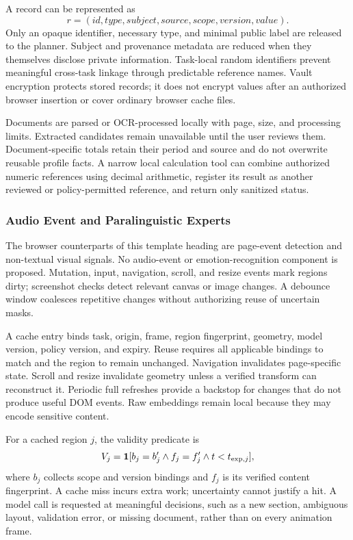 \documentclass[conference]{IEEEtran}
\begin{document}
A record can be represented as
\begin{equation}
 r=(id,type,subject,source,scope,version,value).
\end{equation}
Only an opaque identifier, necessary type, and minimal public label are released to the planner. Subject and provenance metadata are reduced when they themselves disclose private information. Task-local random identifiers prevent meaningful cross-task linkage through predictable reference names. Vault encryption protects stored records; it does not encrypt values after an authorized browser insertion or cover ordinary browser cache files.

Documents are parsed or OCR-processed locally with page, size, and processing limits. Extracted candidates remain unavailable until the user reviews them. Document-specific totals retain their period and source and do not overwrite reusable profile facts. A narrow local calculation tool can combine authorized numeric references using decimal arithmetic, register its result as another reviewed or policy-permitted reference, and return only sanitized status.

\subsubsection{Audio Event and Paralinguistic Experts}
The browser counterparts of this template heading are page-event detection and non-textual visual signals. No audio-event or emotion-recognition component is proposed. Mutation, input, navigation, scroll, and resize events mark regions dirty; screenshot checks detect relevant canvas or image changes. A debounce window coalesces repetitive changes without authorizing reuse of uncertain masks.

A cache entry binds task, origin, frame, region fingerprint, geometry, model version, policy version, and expiry. Reuse requires all applicable bindings to match and the region to remain unchanged. Navigation invalidates page-specific state. Scroll and resize invalidate geometry unless a verified transform can reconstruct it. Periodic full refreshes provide a backstop for changes that do not produce useful DOM events. Raw embeddings remain local because they may encode sensitive content.

For a cached region $j$, the validity predicate is
\begin{equation}
 V_j=\mathbf{1}[b_j=b'_j\land f_j=f'_j\land t<t_{{\rm exp},j}],
\end{equation}
where $b_j$ collects scope and version bindings and $f_j$ is its verified content fingerprint. A cache miss incurs extra work; uncertainty cannot justify a hit. A model call is requested at meaningful decisions, such as a new section, ambiguous layout, validation error, or missing document, rather than on every animation frame.
\end{document}
